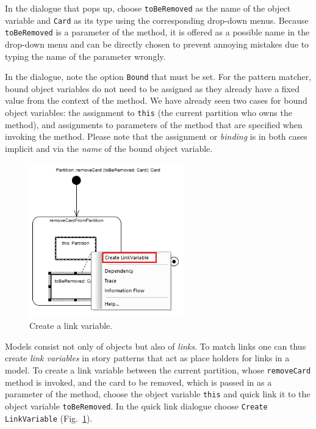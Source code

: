 In the dialogue that pops up, choose \texttt{toBeRemoved} as the name of the object variable and \texttt{Card} as its type using the corresponding drop-down menus. 
Because \texttt{toBeRemoved} is a parameter of the method, it is offered as a possible name in the drop-down menu and can be directly chosen to prevent annoying mistakes due to typing the name of the parameter wrongly.

In the dialogue, note the option \texttt{Bound} that must be set.
For the pattern matcher, bound object variables do not need to be assigned as they already have a fixed value from the context of the method.  
We have already seen two cases  for bound object variables: the assignment to \texttt{this} (the current  partition who owns the method), and assignments to parameters of the 
method that  are specified when invoking the method.  
Please note that the assignment or \emph{binding} is in both cases implicit and via the \emph{name} of the bound object variable. 

\begin{figure}[htp]
\begin{center}
  \includegraphics[width=0.6\textwidth]{pics/sdmBilder/removeCard/sdm11RAW}
  \caption{Create a link variable.}   
  \label{fig:link_variable}
\end{center}
\end{figure}

Models consist not only of objects but also of \emph{links}.  
To match links one can thus create \emph{link variables} in story patterns that act as place 
holders for links in a model.  
To create a link variable between the current partition, whose \texttt{removeCard} method is invoked, and the card to be removed, which is passed in as a parameter of the method, choose the object variable \texttt{this} and quick link it to the object variable \texttt{toBeRemoved}.  
In the quick link dialogue choose \texttt{Create LinkVariable} (Fig.~\ref{fig:link_variable}).

